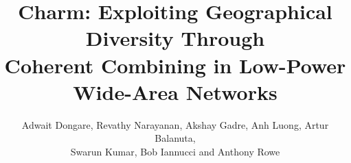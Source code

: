 \documentclass[sigconf]{acmart}
\begin{document}



\acmISBN{}



\title{ Charm: Exploiting Geographical Diversity Through \\ Coherent Combining in Low-Power Wide-Area Networks }


\author{Adwait Dongare, Revathy Narayanan, Akshay Gadre, Anh Luong, Artur Balanuta, \\ Swarun Kumar, Bob Iannucci and Anthony Rowe }

\renewcommand{\shortauthors}{Dongare et al.}
\end{document}
